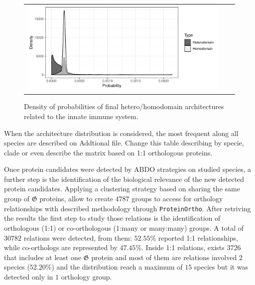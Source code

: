 \documentclass[11pt]{article}
\newcommand{\TODO}[1]{\begingroup\color{red}#1\endgroup}
\begin{document}

\begin{figure}
  \begin{tabular}{lcr}
    \begin{minipage}{0.6\textwidth}
    \centering
    \includegraphics[scale=0.6]{figures/distr_bigrams_complete} 
    \end{minipage}
    & \qquad &
    \begin{minipage}{0.35\textwidth}
    \caption{Density of probabilities of final hetero/homodomain architectures related to the
  innate immune system.}\label{fig:probArch}
    \end{minipage}
  \end{tabular}
\end{figure}

\TODO{When the architecture distribution is considered, the most frequent along 
	all species are described on Addtional file. Change this table 
	describing by specie, clade or even describe the matrix based on 1:1 
	orthologous proteins.
}


Once protein candidates were detected by ABDO strategies on studied species, 
a further step is the identification of the biological relevance of the 
new detected protein candidates. Applying a clustering strategy 
based on sharing the same group of $\boldsymbol{\mathfrak{G}}$ proteins,
allow to create $4787$ groups to access for orthology relationships with 
described methodology through \texttt{ProteinOrtho}. After retriving the
results the first step to study those relations is the identification of 
orthologous (1:1) or co-orthologous (1:many or many:many) groups. 
A total of $30782$ relations were detected, from them: $52.55$\% reported 1:1 
relationships, while co-orthologs are represented by $47.45$\%. Inside 1:1 relations, 
exists $3726$ that includes at least one $\boldsymbol{\mathfrak{G}}$ protein 
and most of them are relations involved $2$ species ($52.20$\%) and 
the distribution reach a maximum of $15$ species but it was detected only 
in $1$ orthology group. 
\end{document}
